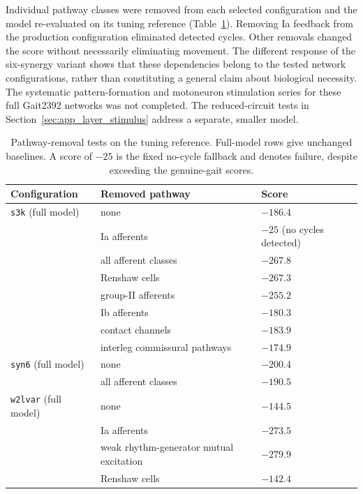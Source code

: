 Individual pathway classes were removed from each selected configuration and the model re-evaluated on its tuning reference (Table~\ref{tab:walker_ablations}). Removing Ia feedback from the production configuration eliminated detected cycles. Other removals changed the score without necessarily eliminating movement. The different response of the six-synergy variant shows that these dependencies belong to the tested network configurations, rather than constituting a general claim about biological necessity. The systematic pattern-formation and motoneuron stimulation series for these full Gait2392 networks was not completed. The reduced-circuit tests in Section~\ref{sec:app_layer_stimulus} address a separate, smaller model.

\begin{table}[htbp]
\caption{Pathway-removal tests on the tuning reference. Full-model rows give unchanged baselines. A score of $-25$ is the fixed no-cycle fallback and denotes failure, despite exceeding the genuine-gait scores.}
\label{tab:walker_ablations}
\small\begin{tabularx}{\textwidth}{@{}>{\raggedright\arraybackslash}p{}>{\raggedright\arraybackslash}X>{\raggedright\arraybackslash}p{}@{}}
\toprule
\textbf{Configuration} & \textbf{Removed pathway} & \textbf{Score} \\
\midrule
\texttt{s3k} (full model) & none & $-186.4$ \\
 & Ia afferents & $-25$ (no cycles detected) \\
 & all afferent classes & $-267.8$ \\
 & Renshaw cells & $-267.3$ \\
 & group-II afferents & $-255.2$ \\
 & Ib afferents & $-180.3$ \\
 & contact channels & $-183.9$ \\
 & interleg commissural pathways & $-174.9$ \\
\addlinespace
\texttt{syn6} (full model) & none & $-200.4$ \\
 & all afferent classes & $-190.5$ \\
\addlinespace
\texttt{w2lvar} (full model) & none & $-144.5$ \\
 & Ia afferents & $-273.5$ \\
 & weak rhythm-generator mutual excitation & $-279.9$ \\
 & Renshaw cells & $-142.4$ \\
\bottomrule
\end{tabularx}
\end{table}

